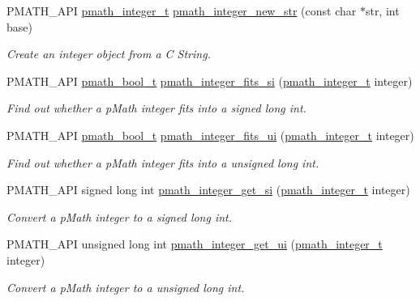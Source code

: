 \begin{CompactItemize}
PMATH\_\-API \hyperlink{classpmath__integer__t}{pmath\_\-integer\_\-t} \hyperlink{group__numbers_gaca3cb69b051e8f361784f2dc3836fcf}{pmath\_\-integer\_\-new\_\-str} (const char $\ast$str, int base)
\begin{CompactList}\small\item\em Create an integer object from a C String. \item\end{CompactList}\item 
PMATH\_\-API \hyperlink{group__general__types_gc92090cb0b56345d6c379ed2341d4ef4}{pmath\_\-bool\_\-t} \hyperlink{group__numbers_gc220e06754067b9ba4a7c823017ad32e}{pmath\_\-integer\_\-fits\_\-si} (\hyperlink{classpmath__integer__t}{pmath\_\-integer\_\-t} integer)
\begin{CompactList}\small\item\em Find out whether a pMath integer fits into a signed long int. \item\end{CompactList}\item 
PMATH\_\-API \hyperlink{group__general__types_gc92090cb0b56345d6c379ed2341d4ef4}{pmath\_\-bool\_\-t} \hyperlink{group__numbers_gb12e5e34b7918cb6beee23c57cdd0d36}{pmath\_\-integer\_\-fits\_\-ui} (\hyperlink{classpmath__integer__t}{pmath\_\-integer\_\-t} integer)
\begin{CompactList}\small\item\em Find out whether a pMath integer fits into a unsigned long int. \item\end{CompactList}\item 
PMATH\_\-API signed long int \hyperlink{group__numbers_g12219f6f678ed0ddff66d352e0dabbd1}{pmath\_\-integer\_\-get\_\-si} (\hyperlink{classpmath__integer__t}{pmath\_\-integer\_\-t} integer)
\begin{CompactList}\small\item\em Convert a pMath integer to a signed long int. \item\end{CompactList}\item 
PMATH\_\-API unsigned long int \hyperlink{group__numbers_g0aed3b6f38410b7e42ffa52be73c6ea6}{pmath\_\-integer\_\-get\_\-ui} (\hyperlink{classpmath__integer__t}{pmath\_\-integer\_\-t} integer)
\begin{CompactList}\small\item\em Convert a pMath integer to a unsigned long int. \item\end{CompactList}\end{CompactItemize}


